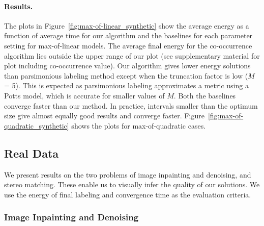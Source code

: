 \documentclass[runningheads]{llncs}
\newcommand{\mysubsection}[1]{\vspace{-1mm}\subsection{#1}\vspace{-1mm}}
\newcommand{\mysubsubsection}[1]{\vspace{0mm}\subsubsection{#1} ~\\ \vspace{-2mm}}
\newcommand{\myparagraph}[1]{\vspace{-2mm}\paragraph{#1}}
\begin{document}
\myparagraph{\bf Results.} The plots in Figure~\ref{fig:max-of-linear_synthetic} show the average energy as a function of average time for our algorithm and the baselines for each parameter setting for max-of-linear models. The average final energy for the co-occurrence algorithm lies outside the upper range of our plot (see supplementary material for plot including co-occurrence value). Our algorithm gives lower energy solutions than parsimonious labeling method except when the truncation factor is low ($M$ = 5). This is expected as parsimonious labeling approximates a metric using a Potts model, which is accurate for smaller values of $M$. Both the baselines converge faster than our method. In practice, intervals smaller than the optimum size give almost equally good results and converge faster. Figure~\ref{fig:max-of-quadratic_synthetic} shows the plots for max-of-quadratic cases.

\mysubsection{Real Data}

We present results on the two problems of image inpainting and denoising, and stereo matching. These enable us to visually infer the quality of our solutions. We use the energy of final labeling and convergence time as the evaluation criteria. 

\mysubsubsection{Image Inpainting and Denoising}
\end{document}
